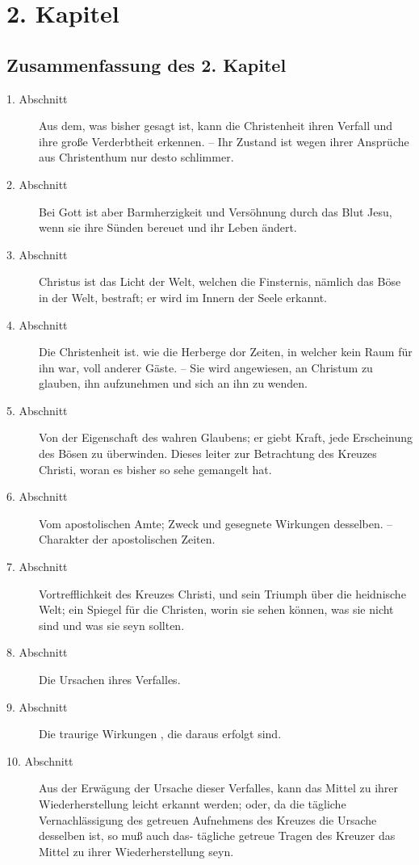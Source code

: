 
\chapter{2. Kapitel}


\section{Zusammenfassung des 2. Kapitel}
\small
\begin{description}
\item[1. Abschnitt] Aus dem, was bisher gesagt ist, kann die Christenheit ihren Verfall und ihre große Verderbtheit erkennen. – Ihr Zustand ist wegen ihrer Ansprüche aus Christenthum nur desto schlimmer.
\item[2. Abschnitt] Bei Gott ist aber Barmherzigkeit und Versöhnung durch das Blut Jesu, wenn sie ihre Sünden bereuet und ihr Leben ändert.
\item[3. Abschnitt] Christus ist das Licht der Welt, welchen die Finsternis, nämlich das Böse in der Welt, bestraft; er wird im Innern der Seele erkannt.
\item[4. Abschnitt] Die Christenheit ist. wie die Herberge dor Zeiten, in welcher kein Raum für ihn war, voll anderer Gäste. – Sie wird angewiesen, an Christum zu glauben, ihn aufzunehmen und sich an ihn zu wenden.
\item[5. Abschnitt] Von der Eigenschaft des wahren Glaubens; er giebt Kraft, jede Erscheinung des Bösen zu überwinden. Dieses leiter zur Betrachtung des Kreuzes Christi, woran es bisher so sehe gemangelt hat.
\item[6. Abschnitt] Vom apostolischen Amte; Zweck und gesegnete Wirkungen desselben. – Charakter der apostolischen Zeiten.
\item[7. Abschnitt] Vortrefflichkeit des Kreuzes Christi, und sein Triumph über die heidnische Welt; ein Spiegel für die Christen, worin sie sehen können, was sie nicht sind und was sie seyn sollten.
\item[8. Abschnitt] Die Ursachen ihres Verfalles.
\item[9. Abschnitt] Die traurige Wirkungen , die daraus erfolgt sind.
\item[10. Abschnitt] Aus der Erwägung der Ursache dieser Verfalles, kann das Mittel zu ihrer Wiederherstellung leicht erkannt werden; oder, da die tägliche Vernachlässigung des getreuen Aufnehmens des Kreuzes die Ursache desselben ist, so muß auch das- tägliche getreue Tragen des Kreuzer das Mittel zu ihrer Wiederherstellung seyn.
\end{description}
\normalsize

